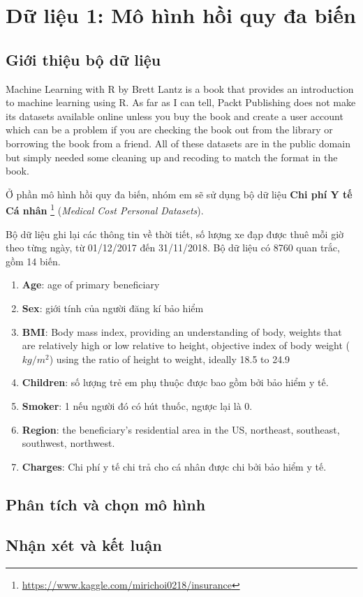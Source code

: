 \section{Dữ liệu 1: Mô hình hồi quy đa biến}

\subsection*{Giới thiệu bộ dữ liệu}
Machine Learning with R by Brett Lantz is a book that provides an introduction to machine learning using R. As far as I can tell, Packt Publishing does not make its datasets available online unless you buy the book and create a user account which can be a problem if you are checking the book out from the library or borrowing the book from a friend. All of these datasets are in the public domain but simply needed some cleaning up and recoding to match the format in the book.

Ở phần mô hình hồi quy đa biến, nhóm em sẽ sử dụng bộ dữ liệu \textbf{Chi phí Y tế Cá nhân} \footnote{\url{https://www.kaggle.com/mirichoi0218/insurance}} (\textit{Medical Cost Personal Datasets}).

Bộ dữ liệu ghi lại các thông tin về thời tiết, số lượng xe đạp được thuê mỗi giờ theo từng ngày, từ 01/12/2017 đến 31/11/2018. Bộ dữ liệu có 8760 quan trắc, gồm 14 biến.
\begin{enumerate}
	\item \textbf{Age}: age of primary beneficiary
	\item \textbf{Sex}: giới tính của người đăng kí bảo hiểm
	\item \textbf{BMI}: Body mass index, providing an understanding of body, weights that are relatively high or low relative to height,	objective index of body weight ($kg / m ^ 2$) using the ratio of height to weight, ideally 18.5 to 24.9
	\item \textbf{Children}: số lượng trẻ em phụ thuộc được bao gồm bởi bảo hiểm y tế.	
	\item \textbf{Smoker}: 1 nếu người đó có hút thuốc, ngược lại là 0.
	\item \textbf{Region}: the beneficiary's residential area in the US, northeast, southeast, southwest, northwest.
	\item \textbf{Charges}: Chi phí y tế chi trả cho cá nhân được chi bởi bảo hiểm y tế.
\end{enumerate}

\subsection*{Phân tích và chọn mô hình}

\subsection*{Nhận xét và kết luận}